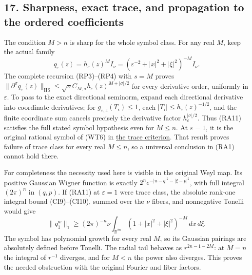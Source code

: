 \documentclass[
  11pt,
]{article}
\begin{document}
\subsection{17. Sharpness, exact trace, and propagation to the ordered
coefficients}\label{sharpness-exact-trace-and-propagation-to-the-ordered-coefficients}

The condition \(M>n\) is sharp for the whole symbol class. For any real
\(M\), keep the actual family \[
 q_\varepsilon(z)=h_\varepsilon(z)^M I_\nu
     =(\varepsilon^{-2}+|x|^2+|\xi|^2)^{-M}I_\nu.
 \tag{RA11}
\] The complete recursion (RP3)--(RP4) with \(s=M\) proves
\(\|\partial^\sigma q_\varepsilon(z)\|_{\mathrm{HS}}
\leq\sqrt\nu C_{M,\sigma}h_\varepsilon(z)^{M+|\sigma|/2}\) for every
derivative order, uniformly in \(\varepsilon\). To pass to the exact
directional seminorm, expand each directional derivative into coordinate
derivatives; for \(g_{\varepsilon,z}(T_i)\leq1\), each
\(|T_i|\leq h_\varepsilon(z)^{-1/2}\), and the finite coordinate sum
cancels precisely the derivative factor \(h_\varepsilon^{|\sigma|/2}\).
Thus (RA11) satisfies the full stated symbol hypothesis even for
\(M\leq n\). At \(\varepsilon=1\), it is the original rational symbol of
(WT6) in \href{weyl-trace-criterion.pdf}{the trace criterion}. That
result proves failure of trace class for every real \(M\leq n\), so a
universal conclusion in (RA1) cannot hold there.

For completeness the necessity used here is visible in the original Weyl
map. Its positive Gaussian Wigner function is exactly
\(2^n e^{-|u-q|^2-|\xi-p|^2}\), with full integral \((2\pi)^n\) in
\((q,p)\). If (RA11) at \(\varepsilon=1\) were trace class, the absolute
rank-one integral bound (CI9)--(CI10), summed over the \(\nu\) fibers,
and nonnegative Tonelli would give \[
 \|q_1^w\|_1
       \geq (2\pi)^{-n}\nu
             \int_{\mathbb R^{2n}}(1+|x|^2+|\xi|^2)^{-M}
                                         \,dx\,d\xi.
 \tag{RA12}
\] The symbol has polynomial growth for every real \(M\), so its
Gaussian pairings are absolutely defined before Tonelli. The radial tail
behaves as \(r^{2n-1-2M}\): at \(M=n\) the integral of \(r^{-1}\)
diverges, and for \(M<n\) the power also diverges. This proves the
needed obstruction with the original Fourier and fiber factors.
\end{document}
